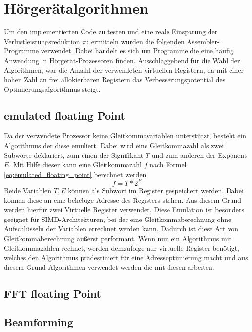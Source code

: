 \section{Hörgerätalgorithmen}
\label{sec:testprogamme}
Um den implementierten Code zu testen und eine reale Einsparung der Verlustleistungsreduktion zu ermitteln wurden die folgenden Assembler-Programme verwendet. Dabei handelt es sich um Programme die eine häufig Anwendung in Hörgerät-Prozessoren finden. Ausschlaggebend für die Wahl der Algorithmen, war die Anzahl der verwendeten virtuellen Registern, da mit einer hohen Zahl an frei allokierbaren Registern das Verbesserungspotential des Optimierungsalgorithmus steigt.

\subsection{emulated floating Point}
\label{chap:emulated_floating_point}
Da der verwendete Prozessor keine Gleitkommavariablen unterstützt, besteht ein Algorithmus der diese emuliert. Dabei wird eine Gleitkommazahl als zwei Subworte deklariert, zum einen der Signifikant $T$ und zum anderen der Exponent $E$. Mit Hilfe dieser kann eine Gleitkommazahl $f$ nach Formel \ref{eq:emulated_floating_point} berechnet werden.
\begin{equation}
f = T *2^E
\label{eq:emulated_floating_point}
\end{equation}
Beide Variablen $ T,E$ können als Subwort im Register gespeichert werden. Dabei können diese an eine beliebige Adresse des Registers stehen. Aus diesem Grund werden hierfür zwei Virtuelle Register verwendet. Diese Emulation ist besonders geeignet für SIMD-Architekturen, bei der eine Gleitkommaberechnung ohne Aufschlüsseln der Variablen errechnet werden kann. Dadurch ist diese Art von Gleitkommaberechnung äußerst performant.
Wenn nun ein Algorithmus mit Gleitkommazahlen rechnet, werden demzufolge nur virtuelle Register benötigt, welches den Algorithmus prädestiniert für eine Adressoptimierung macht und aus diesem Grund Algorithmen verwendet werden die mit diesen arbeiten. \cite{gerlach2016efficient}

\subsection{FFT floating Point}



\subsection{Beamforming}

